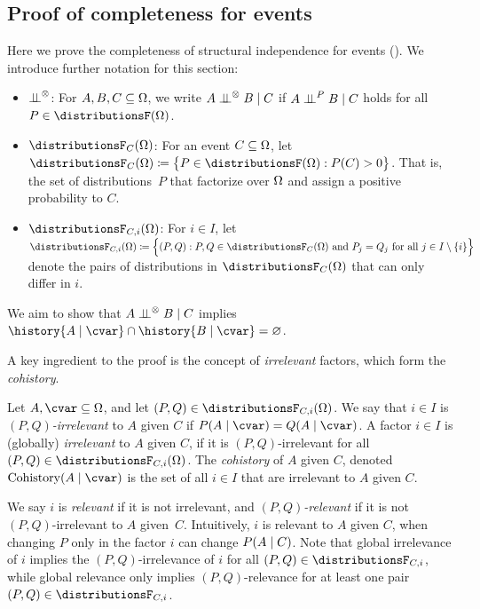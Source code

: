 \documentclass[USenglish,onecolumn]{article}
\begin{document}
\subsection{Proof of completeness for events}
\label{sec:completeevents}
Here we prove the completeness of structural independence for events ().
%
We introduce further notation for this section:
\begin{itemize}
\item $\mathrel{\perp\!\!\!\perp}^\otimes$: For $A, B, C \subseteq \Omega$, we write $A \mathrel{\perp\!\!\!\perp}^\otimes B \mid C$ if  $A \mathrel{\perp\!\!\!\perp}^P B \mid C$ holds for all $P \in \distributionsF(\Omg)$.
  \item $\distributionsF_C(\Omg)$: For an event $C \subseteq \Omega$, let
  $\distributionsF_C(\Omg) \coloneqq \big\lbrace P \in \distributionsF(\Omg): P(C) > 0 \big\rbrace$. That is, the set of distributions~$P$ that factorize over $\Omega$ and assign a positive probability to $C$.
  \item $\distributionsF_{C,i} (\Omg)$: For $i \in I$, let $\distributionsF_{C, i}(\Omg) \coloneqq
    \Big\lbrace(P,Q): P,Q \in \distributionsF_{C}(\Omg) \text{ and } P_{j} = Q_{j} \text{ for all $j\in I\setminus\{i\}$}\Big\rbrace$   denote the pairs of distributions in $\distributionsF_C(\Omg)$ that can only differ in $i$.
\end{itemize}
We aim to show that $A \mathrel{\perp\!\!\!\perp}^\otimes B \mid C$ implies $\history{A \given \cvar} \sect \history{B \given \cvar} = \nothing$.

A key ingredient to the proof is the concept of \emph{irrelevant} factors, which form the \emph{cohistory}.

\begin{definition}
  Let $A,\cvar \subseteq \factors$, and let $(P,Q) \in \distributionsF_{C, i}(\Omg)$.
  We say that $i\in I$ is \emph{$(P,Q)$-irrelevant} to $A$ given $C$ if $P(A \given \cvar) = Q(A \given \cvar)$. A factor $i \in I$ is (globally) \emph{irrelevant} to $A$ given $C$, if it is $(P,Q)$-irrelevant for all $(P,Q) \in \distributionsF_{C, i}(\Omg)$.
  The \emph{cohistory} of $A$ given $C$, denoted $\historyC(A \given \cvar)$ is the set of all $i\in I$ that are irrelevant to $A$ given $C$.
\end{definition}
We say $i$ is \emph{relevant} if it is not irrelevant, and \emph{$(P,Q)$-relevant} if it is not $(P,Q)$-irrelevant to $A$ given~$C$.
Intuitively, $i$ is relevant to $A$ given $C$, when changing $P$ only in the factor $i$ can change $P(A\mid C)$.
Note that global irrelevance of $i$ implies the $(P,Q)$-irrelevance of $i$ for all $(P,Q)\in\distributionsF_{C,i}$, while global relevance only implies $(P,Q)$-relevance for at least one pair $(P,Q)\in \distributionsF_{C,i}$.
\end{document}
